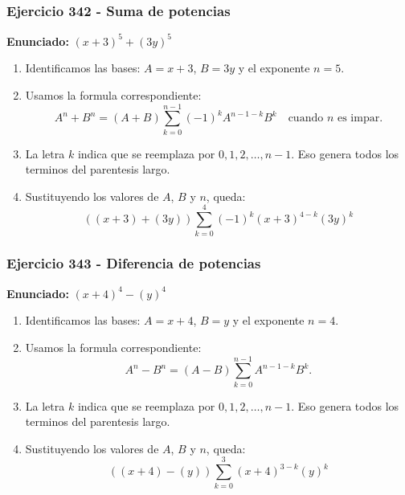 \documentclass[11pt,a4paper]{article}
\begin{document}
\subsubsection*{Ejercicio 342 - Suma de potencias}
\textbf{Enunciado:} $ \left(x + 3\right)^{5}+\left(3 y\right)^{5} $\par
\begin{enumerate}[leftmargin=2em]
\item Identificamos las bases: \(A=x + 3\), \(B=3 y\) y el exponente \(n=5\).
\item Usamos la formula correspondiente: \[A^n+B^n=(A+B)\sum_{k=0}^{n-1}(-1)^kA^{n-1-k}B^k\quad\text{cuando }n\text{ es impar}.\]
\item La letra \(k\) indica que se reemplaza por \(0,1,2,\ldots,n-1\). Eso genera todos los terminos del parentesis largo.
\item Sustituyendo los valores de \(A\), \(B\) y \(n\), queda: \[\boxed{\left(\left(x + 3\right)+\left(3 y\right)\right)\sum_{k=0}^{4}(-1)^k\left(x + 3\right)^{4-k}\left(3 y\right)^k}\]
\end{enumerate}

\vspace{0.2cm}
\subsubsection*{Ejercicio 343 - Diferencia de potencias}
\textbf{Enunciado:} $ \left(x + 4\right)^{4}-\left(y\right)^{4} $\par
\begin{enumerate}[leftmargin=2em]
\item Identificamos las bases: \(A=x + 4\), \(B=y\) y el exponente \(n=4\).
\item Usamos la formula correspondiente: \[A^n-B^n=(A-B)\sum_{k=0}^{n-1}A^{n-1-k}B^k.\]
\item La letra \(k\) indica que se reemplaza por \(0,1,2,\ldots,n-1\). Eso genera todos los terminos del parentesis largo.
\item Sustituyendo los valores de \(A\), \(B\) y \(n\), queda: \[\boxed{\left(\left(x + 4\right)-\left(y\right)\right)\sum_{k=0}^{3}\left(x + 4\right)^{3-k}\left(y\right)^k}\]
\end{enumerate}

\vspace{0.2cm}
\end{document}
